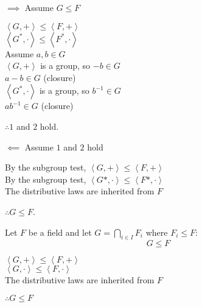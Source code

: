 \documentclass[letterpaper,12pt,fleqn]{article}
\newcommand{\group}[2]{\left<#1,#2\right>}
\begin{document}
\begin{theproof}
  \listbreak
  \begin{description}
    \begin{minipage}[t]{3in}
    \item $\implies$ Assume $G\le F$

      $\group{G}{+}\le\group{F}{+}$ \\
      $\group{G^*}{\cdot}\le\group{F^*}{\cdot}$ \\
      Assume $a,b\in G$ \\
      $\group{G}{+}$ is a group, so $-b\in G$ \\
      $a-b\in G$ (closure) \\
      $\group{G^*}{\cdot}$ is a group, so $b^{-1}\in G$ \\
      $ab^{-1}\in G$ (closure)

      $\therefore 1$ and $2$ hold.
    \end{minipage}
    \begin{minipage}[t]{3in}
    \item $\impliedby$ Assume $1$ and $2$ hold

      By the subgroup test, $\group{G}{+}\le\group{F}{+}$ \\
      By the subgroup test, $\group{G*}{\cdot}\le\group{F*}{\cdot}$ \\
      The distributive laws are inherited from $F$

      $\therefore G\le F$.
    \end{minipage}
  \end{description}
\end{theproof}

\begin{theorem}
  Let $F$ be a field and let $G=\bigcap_{i\in I}F_i$ where $F_i\le F$:
  \[G\le F\]
\end{theorem}

\begin{theproof}
  $\group{G}{+}\le\group{F}{+}$ \\
  $\group{G}{\cdot}\le\group{F}{\cdot}$ \\
  The distributive laws are inherited from $F$

  $\therefore G\le F$
\end{theproof}
\end{document}
